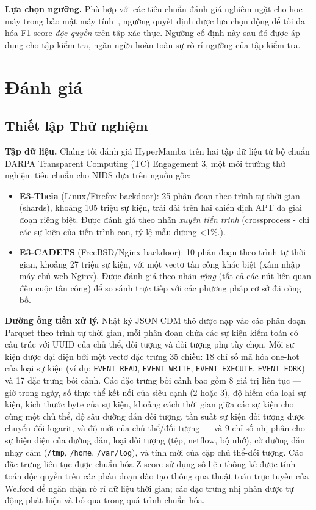 \documentclass[letterpaper,twocolumn,10pt]{article}
\begin{document}
\textbf{Lựa chọn ngưỡng.} Phù hợp với các tiêu chuẩn đánh giá nghiêm ngặt cho học máy trong bảo mật máy tính~\cite{arp2022dos}, ngưỡng quyết định được lựa chọn động để tối đa hóa F1-score \emph{độc quyền} trên tập xác thực. Ngưỡng cố định này sau đó được áp dụng cho tập kiểm tra, ngăn ngừa hoàn toàn sự rò rỉ ngưỡng của tập kiểm tra.

\section{Đánh giá}
\label{sec:evaluation}

\subsection{Thiết lập Thử nghiệm}
\label{sec:experimental_setup}

\textbf{Tập dữ liệu.} Chúng tôi đánh giá HyperMamba trên hai tập dữ liệu từ bộ chuẩn DARPA Transparent Computing (TC) Engagement 3, một môi trường thử nghiệm tiêu chuẩn cho NIDS dựa trên nguồn gốc:
\begin{itemize}
    \item \textbf{E3-Theia} (Linux/Firefox backdoor): 25 phân đoạn theo trình tự thời gian (shards), khoảng 105 triệu sự kiện, trải dài trên hai chiến dịch APT đa giai đoạn riêng biệt. Được đánh giá theo nhãn \emph{xuyên tiến trình} (crossprocess - chỉ các sự kiện của tiến trình con, tỷ lệ mẫu dương <1\%.).
    \item \textbf{E3-CADETS} (FreeBSD/Nginx backdoor): 10 phân đoạn theo trình tự thời gian, khoảng 27 triệu sự kiện, với một vectơ tấn công khác biệt (xâm nhập máy chủ web Nginx). Được đánh giá theo nhãn \emph{rộng} (tất cả các nút liên quan đến cuộc tấn công) để so sánh trực tiếp với các phương pháp cơ sở đã công bố.
\end{itemize}

\textbf{Đường ống tiền xử lý.} Nhật ký JSON CDM thô được nạp vào các phân đoạn Parquet theo trình tự thời gian, mỗi phân đoạn chứa các sự kiện kiểm toán có cấu trúc với UUID của chủ thể, đối tượng và đối tượng phụ tùy chọn. Mỗi sự kiện được đại diện bởi một vectơ đặc trưng 35 chiều: 18 chỉ số mã hóa one-hot của loại sự kiện (ví dụ: \texttt{EVENT\_READ}, \texttt{EVENT\_WRITE}, \texttt{EVENT\_EXECUTE}, \texttt{EVENT\_FORK}) và 17 đặc trưng bối cảnh. Các đặc trưng bối cảnh bao gồm 8 giá trị liên tục --- giờ trong ngày, số thực thể kết nối của siêu cạnh (2 hoặc 3), độ hiếm của loại sự kiện, kích thước byte của sự kiện, khoảng cách thời gian giữa các sự kiện cho cùng một chủ thể, độ sâu đường dẫn đối tượng, tần suất sự kiện đối tượng được chuyển đổi logarit, và độ mới của chủ thể/đối tượng --- và 9 chỉ số nhị phân cho sự hiện diện của đường dẫn, loại đối tượng (tệp, netflow, bộ nhớ), cờ đường dẫn nhạy cảm (\texttt{/tmp}, \texttt{/home}, \texttt{/var/log}), và tính mới của cặp chủ thể-đối tượng. Các đặc trưng liên tục được chuẩn hóa Z-score sử dụng số liệu thống kê được tính toán độc quyền trên các phân đoạn đào tạo thông qua thuật toán trực tuyến của Welford để ngăn chặn rò rỉ dữ liệu thời gian; các đặc trưng nhị phân được tự động phát hiện và bỏ qua trong quá trình chuẩn hóa.
\end{document}
